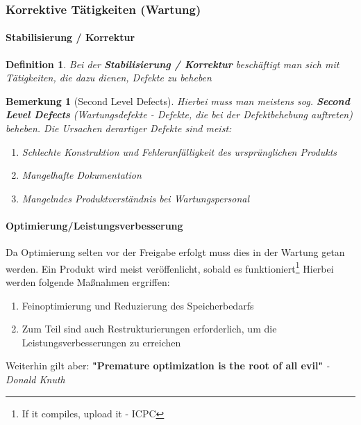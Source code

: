 \documentclass[a4paper]{article}
\theoremstyle{break}
\newtheorem{defi}{Definition}[section]
\newtheorem{ann}{Bemerkung}[section]
\begin{document}
\subsubsection{Korrektive Tätigkeiten (Wartung)}
\setcounter{secnumdepth}{4} %
\paragraph{Stabilisierung / Korrektur}
\begin{defi}
	Bei der \textbf{Stabilisierung / Korrektur} beschäftigt man sich mit Tätigkeiten, die dazu dienen, Defekte zu beheben
\end{defi}

\begin{ann}[Second Level Defects]
	Hierbei muss man meistens sog. \textbf{Second Level Defects} (\textit{Wartungsdefekte - Defekte, die bei der Defektbehebung auftreten}) beheben.
	\newline
	Die Ursachen derartiger Defekte sind meist:
	\begin{enumerate}
		\item Schlechte Konstruktion und Fehleranfälligkeit des ursprünglichen Produkts
		\item Mangelhafte Dokumentation
		\item Mangelndes Produktverständnis bei Wartungspersonal
	\end{enumerate}
\end{ann}
\paragraph{Optimierung/Leistungsverbesserung}
Da Optimierung selten vor der Freigabe erfolgt muss dies in der Wartung getan werden. Ein Produkt wird meist veröffenlicht, sobald es funktioniert\footnote{If it compiles, upload it - ICPC}\newline
Hierbei werden folgende Maßnahmen ergriffen:
\begin{enumerate}
	\item Feinoptimierung und Reduzierung des Speicherbedarfs
	\item Zum Teil sind auch Restrukturierungen erforderlich, um die Leistungsverbesserungen zu erreichen
\end{enumerate}
Weiterhin gilt aber: \textbf{"Premature optimization is the root of all evil"}\textit{ - Donald Knuth}
\end{document}
